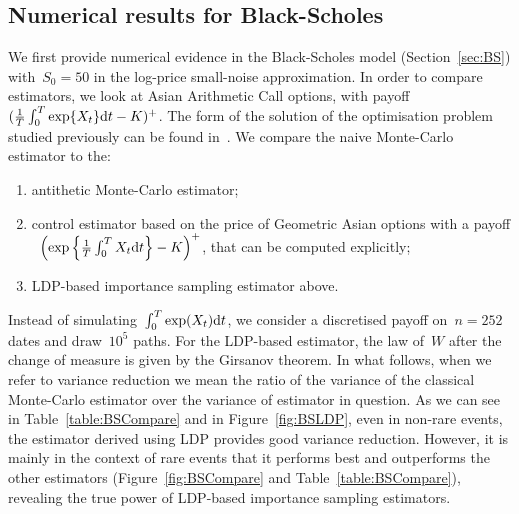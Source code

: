\subsection{Numerical results for Black-Scholes}\label{sec:BS_numerical_results}
We first provide numerical evidence in the Black-Scholes model (Section~\ref{sec:BS}) with~$S_0=50$ in the log-price small-noise approximation.
In order to compare estimators, we look at Asian Arithmetic Call options, 
with payoff~$(\frac{1}{T}\int_0^T \exp\{X_t\} \mathrm{d} t - K)^+$. The form of the solution of the optimisation problem studied previously can be found in~\cite{Guasoni2007OptimalTime}. We compare the naive Monte-Carlo estimator to the: 
\begin{enumerate}[-]
    \item antithetic Monte-Carlo estimator;
    \item control estimator based on the price of Geometric Asian options with a payoff
   ~$\left(\exp\left\{\frac{1}{T}\int_0^T X_t \mathrm{d} t\right\} - K\right)^+$,
    that can be computed explicitly;
    \item LDP-based importance sampling estimator above.
\end{enumerate}
Instead of simulating~$\int_0^T \exp(X_t)\mathrm{d} t$, we consider a discretised payoff on~$n=252$ dates and draw~$10^5$ paths.
For the LDP-based estimator, the law of~$W$ after the change of measure is given by the Girsanov theorem.
In what follows, when we refer to variance reduction we mean the ratio of the variance of the classical Monte-Carlo estimator over the variance of estimator in question.
As we can see in Table~\ref{table:BSCompare} and in Figure~\ref{fig:BSLDP}, 
even in non-rare events, the estimator derived using LDP provides good variance reduction. 
However, it is mainly in the context of rare events that it performs best and outperforms the other estimators (Figure~\ref{fig:BSCompare} and Table~\ref{table:BSCompare}), 
revealing the true power of LDP-based importance sampling estimators.


